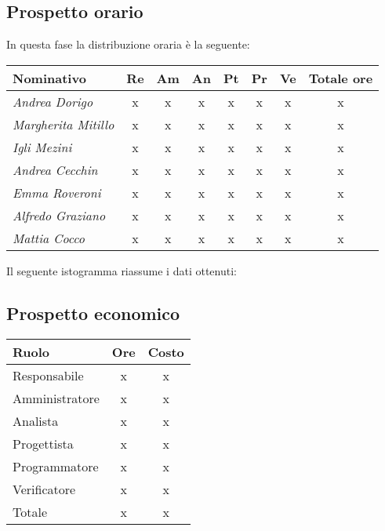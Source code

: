 \subsection{Prospetto orario}\label{5.1.1}
In questa fase la distribuzione oraria è la seguente:
\quad
\def\tabularxcolumn#1{m{#1}}
{
	
	\begin{center}
		\renewcommand{\arraystretch}{1.4}
		\begin{tabularx}{\textwidth}{|X|c|c|c|c|c|c|c|}
			\hline
			\rowcolor{airforceblue}
			\textbf{Nominativo} & \textbf{Re} & \textbf{Am} & \textbf{An} & \textbf{Pt} & \textbf{Pr} & \textbf{Ve} & \textbf{Totale ore}\\
			\hline
			\textit{Andrea Dorigo} & x & x & x & x & x & x & x\\
			\hline
			\textit{Margherita Mitillo} & x & x & x & x & x & x & x\\
			\hline
			\textit{Igli Mezini} & x & x & x & x & x & x & x\\
			\hline
			\textit{Andrea Cecchin} & x & x & x & x & x & x & x\\
			\hline
			\textit{Emma Roveroni} & x & x & x & x & x & x & x\\
			\hline
			\textit{Alfredo Graziano} & x & x & x & x & x & x & x\\
			\hline
			\textit{Mattia Cocco} & x & x & x & x & x & x & x\\
			\hline
		\end{tabularx}
	\end{center}

Il seguente istogramma riassume i dati ottenuti:

\subsection{Prospetto economico}\label{5.1.2}
\quad
\def\tabularxcolumn#1{m{#1}}
{	
	\begin{center}
		\renewcommand{\arraystretch}{1.4}
		\begin{tabularx}{7cm}{|X|c|c|}
			\hline
			\rowcolor{airforceblue}
			\textbf{Ruolo} & \textbf{Ore} & \textbf{Costo}\\
			\hline
			Responsabile & x & x\\
			\hline
			Amministratore & x & x\\
			\hline
			Analista & x & x\\
			\hline
			Progettista & x & x\\
			\hline
			Programmatore & x & x\\
			\hline
			Verificatore & x & x\\
			\hline
			Totale & x & x\\
			\hline
		\end{tabularx}
	\end{center}

}}
